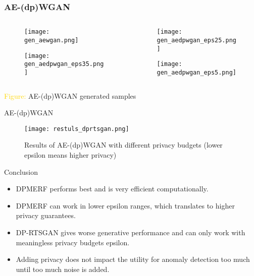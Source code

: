 \begin{frame}
    \frametitle{AE-(dp)WGAN}

    \begin{columns}
        \begin{column}{0.48\textwidth}
        \begin{figure}
            \centering
            \texttt{[image: gen\_aewgan.png]}
        \end{figure}
        \begin{figure}[h]
            \centering
            \texttt{[image: gen\_aedpwgan\_eps35.png]}
        \end{figure}
    \end{column}
    \begin{column}{0.48\textwidth}
        \begin{figure}
            \centering
            \texttt{[image: gen\_aedpwgan\_eps25.png]}
        \end{figure}
        \begin{figure}[h]
            \centering
            \texttt{[image: gen\_aedpwgan\_eps5.png]}
        \end{figure}
    \end{column}
    
    \end{columns}
    \centering
    \textcolor{gold}{Figure:} AE-(dp)WGAN generated samples

\end{frame}

\begin{frame}{AE-(dp)WGAN}
    \begin{figure}
        \centering
        \texttt{[image: restuls\_dprtsgan.png]}
        \caption{Results of AE-(dp)WGAN with different privacy budgets (lower epsilon means higher privacy)}
        \label{fig:enter-label}
    \end{figure}
\end{frame}

\begin{frame}{Conclusion}
    \begin{itemize}
        \item DPMERF performs best and is very efficient computationally.
        \item DPMERF can work in lower epsilon ranges, which translates to higher privacy guarantees.
        \item DP-RTSGAN gives worse generative performance and can only work with meaningless privacy budgets epsilon.
        \item Adding privacy does not impact the utility for anomaly detection too much until too much noise is added.
    \end{itemize}
\end{frame}

